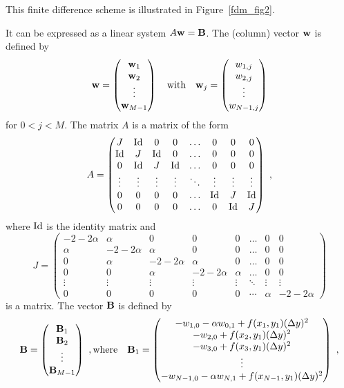 This finite difference scheme is illustrated in Figure~\ref{fdm_fig2}.

It can be expressed as a linear system $A\mathbf{w} = \mathbf{B}$.
The (column) vector $\mathbf{w}$ is defined by
\[
\mathbf{w} = \begin{pmatrix}
\mathbf{w}_1 \\ \mathbf{w}_2 \\ \vdots \\ \mathbf{w}_{M-1}
\end{pmatrix}
\quad \text{with} \quad
\mathbf{w}_j =
\begin{pmatrix} w_{1,j} \\ w_{2,j} \\ \vdots \\ w_{N-1,j} \end{pmatrix}
\]
for $0 < j < M$.  The matrix $A$ is a  matrix of
the form
\[
A = \begin{pmatrix}
J & \operatorname{Id} & 0 & 0 & \ldots & 0 & 0 & 0 \\
\operatorname{Id} & J & \operatorname{Id} & 0 & \ldots & 0 & 0 & 0 \\
0 & \operatorname{Id} & J & \operatorname{Id} & \ldots & 0 & 0 & 0 \\
\vdots & \vdots & \vdots & \vdots & \ddots & \vdots & \vdots & \vdots \\
0 & 0 & 0 & 0 & \ldots & \operatorname{Id} & J & \operatorname{Id} \\
0 & 0 & 0 & 0 & \ldots & 0 & \operatorname{Id} & J
\end{pmatrix} \ ,
\]
where $\operatorname{Id}$ is the  identity matrix and
\begin{equation} \label{fdm_JE}
J = \begin{pmatrix}
-2-2\alpha & \alpha & 0 & 0 & 0 & \ldots & 0 & 0 \\
\alpha & -2-2\alpha & \alpha & 0 & 0 & \ldots & 0 & 0  \\
0 & \alpha & -2-2\alpha & \alpha & 0 & \ldots & 0 & 0 \\
0 & 0 & \alpha & -2-2\alpha & \alpha & \ldots & 0 & 0 \\
\vdots & \vdots & \vdots & \vdots & \vdots & \ddots & \vdots & \vdots \\
0 & 0 & 0 & 0 & 0 & \cdots & \alpha & -2-2\alpha
\end{pmatrix}    
\end{equation}
is a  matrix.
The vector $\mathbf{B}$ is defined by
\[
\mathbf{B} = \begin{pmatrix} \mathbf{B}_1 \\ \mathbf{B}_2 \\ \vdots \\
\mathbf{B}_{M-1} \end{pmatrix} \ ,
\text{where} \quad
\mathbf{B}_1 = \begin{pmatrix}
-w_{1,0} - \alpha w_{0,1} + f(x_1,y_1)(\Delta{y})^2\\
-w_{2,0} + f(x_2,y_1)(\Delta{y})^2 \\
-w_{3,0} + f(x_3,y_1)(\Delta{y})^2 \\
\vdots \\
-w_{N-1,0} -\alpha w_{N,1}+ f(x_{N-1},y_1)(\Delta{y})^2\\
\end{pmatrix}
\ ,
\]
